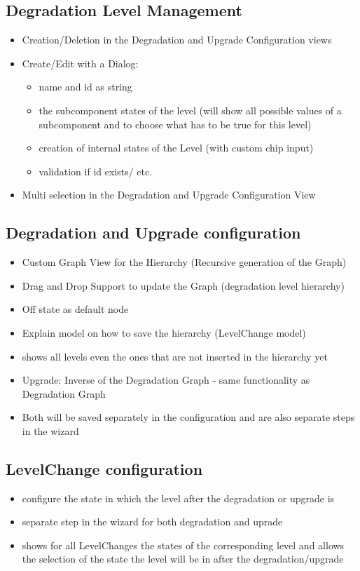 \subsection{Degradation Level Management}
\begin{itemize}
    \item Creation/Deletion in the Degradation and Upgrade Configuration views
    \item Create/Edit with a Dialog:
    \begin{itemize}
        \item name and id as string
        \item the subcomponent states of the level (will show all possible values of a subcomponent and to choose what has to be true for this level)
        \item creation of internal states of the Level (with custom chip input)
        \item validation if id exists/ etc.
    \end{itemize}
    \item Multi selection in the Degradation and Upgrade Configuration View
\end{itemize}

\subsection{Degradation and Upgrade configuration}
\begin{itemize}
    \item Custom Graph View for the Hierarchy (Recursive generation of the Graph)
    \item Drag and Drop Support to update the Graph (degradation level hierarchy)
    \item Off state as default node
    \item Explain model on how to save the hierarchy (LevelChange model) 
    \item shows all levels even the ones that are not inserted in the hierarchy yet
    \item Upgrade: Inverse of the Degradation Graph - same functionality as Degradation Graph
    \item Both will be saved separately in the configuration and are also separate steps in the wizard
\end{itemize}

\subsection{LevelChange configuration}
\begin{itemize}
    \item configure the state in which the level after the degradation or upgrade is
    \item separate step in the wizard for both degradation and uprade
    \item shows for all LevelChanges the states of the corresponding level and allows the selection of the state the level will be in after the degradation/upgrade 
\end{itemize}